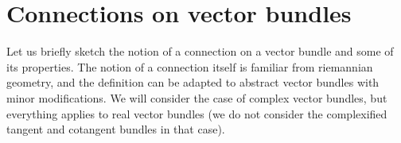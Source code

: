 \section{Connections on vector bundles} \label{section_connections_vector_bundles}
Let us briefly sketch the notion of a connection on a vector bundle and some of its properties. The notion of a connection itself is familiar from riemannian geometry, and the definition can be adapted to abstract vector bundles with minor modifications. We will consider the case of complex vector bundles, but everything applies to real vector bundles (we do not consider the complexified tangent and cotangent bundles in that case).



